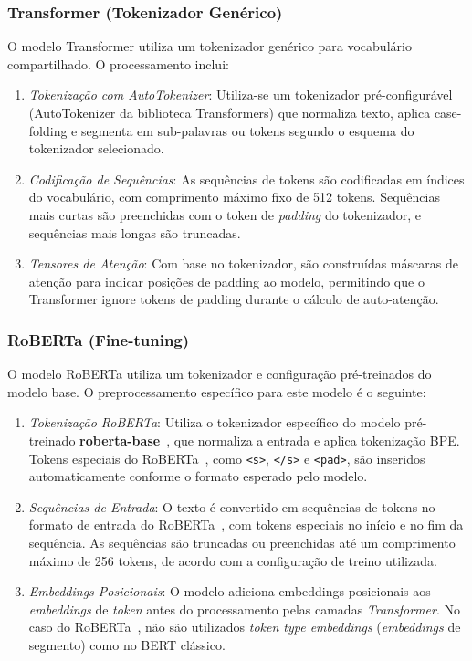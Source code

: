 \documentclass[runningheads]{llncs}
\begin{document}
\subsubsection{Transformer (Tokenizador Genérico)}

O modelo Transformer utiliza um tokenizador genérico para vocabulário compartilhado. O processamento inclui:

\begin{enumerate}
    \item \textit{Tokenização com AutoTokenizer}: Utiliza-se um tokenizador pré-configurável (AutoTokenizer da biblioteca Transformers) que normaliza texto, aplica case-folding e segmenta em sub-palavras ou tokens segundo o esquema do tokenizador selecionado.
    
    \item \textit{Codificação de Sequências}: As sequências de tokens são codificadas em índices do vocabulário, com comprimento máximo fixo de 512 tokens. Sequências mais curtas são preenchidas com o token de \textit{padding} do tokenizador, e sequências mais longas são truncadas.
    
    \item \textit{Tensores de Atenção}: Com base no tokenizador, são construídas máscaras de atenção para indicar posições de padding ao modelo, permitindo que o Transformer ignore tokens de padding durante o cálculo de auto-atenção.
\end{enumerate}

\subsubsection{RoBERTa (Fine-tuning)}

O modelo RoBERTa utiliza um tokenizador e configuração pré-treinados do modelo base. O preprocessamento específico para este modelo é o seguinte:

\begin{enumerate}
    \item \textit{Tokenização RoBERTa}: Utiliza o tokenizador específico do modelo pré-treinado \textbf{roberta-base}~\cite{ref_roberta}, que normaliza a entrada e aplica tokenização BPE. Tokens especiais do RoBERTa~\cite{ref_roberta}, como \texttt{<s>}, \texttt{</s>} e \texttt{<pad>}, são inseridos automaticamente conforme o formato esperado pelo modelo.
    
    \item \textit{Sequências de Entrada}: O texto é convertido em sequências de tokens no formato de entrada do RoBERTa~\cite{ref_roberta}, com tokens especiais no início e no fim da sequência. As sequências são truncadas ou preenchidas até um comprimento máximo de 256 tokens, de acordo com a configuração de treino utilizada.
    
    \item \textit{Embeddings Posicionais}: O modelo adiciona embeddings posicionais aos \textit{embeddings} de \textit{token} antes do processamento pelas camadas \textit{Transformer}. No caso do RoBERTa~\cite{ref_roberta}, não são utilizados \textit{token type embeddings} (\textit{embeddings} de segmento) como no BERT clássico.
\end{enumerate}
\end{document}
